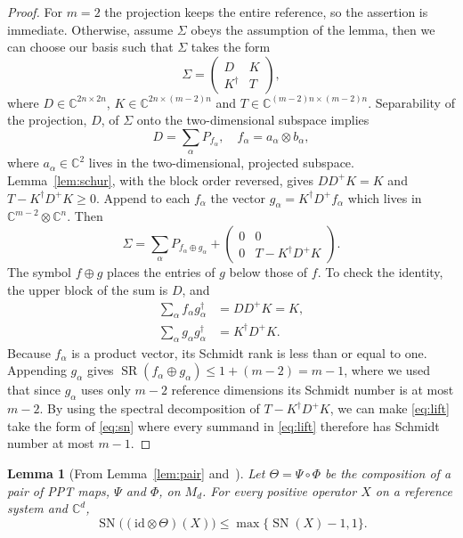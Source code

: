 \documentclass[aps,prl,reprint,superscriptaddress,longbibliography,raggedbottom]{revtex4-2}
\newtheorem{lemma}{Lemma}
\newcommand{\C}{\mathbb C}
\newcommand{\id}{\mathrm{id}}
\newcommand{\SN}{\operatorname{SN}}
\newcommand{\SR}{\operatorname{SR}}
\begin{document}
\begin{proof}
For $m=2$ the projection keeps the entire reference, so the assertion
is immediate. Otherwise, assume $\Sigma$ obeys the assumption of the lemma, then we can choose our basis such that $\Sigma$ takes the form
\begin{equation}\label{eq:liftblocks}
\Sigma=\begin{pmatrix}D&K\\K^\dagger&T\end{pmatrix},
\end{equation}
where $D \in \C^{2n \times 2n}$, $K \in \C^{2n \times (m-2)n}$ and $T \in \C^{(m-2)n \times (m-2)n}$. Separability of the projection, $D$, of $\Sigma$ onto the two-dimensional subspace implies 
\begin{equation}
D=\sum_\alpha P_{f_\alpha},\quad f_\alpha=a_\alpha\otimes b_\alpha, 
\end{equation}
where $a_{\alpha} \in \C^2$ lives in the two-dimensional, projected subspace. 
Lemma~\ref{lem:schur}, with the block order reversed, gives
$DD^+K=K$ and $T-K^\dagger D^+K\ge0$. Append to each $f_\alpha$
the vector $g_\alpha=K^\dagger D^+f_\alpha$ which lives in $\C^{m-2} \otimes \C^n$. Then
\begin{equation}\label{eq:lift}
\Sigma=\sum_\alpha P_{f_\alpha\oplus g_\alpha}
+\begin{pmatrix}0&0\\0&T-K^\dagger D^+K\end{pmatrix}.
\end{equation}
The symbol $f\oplus g$ places the entries of $g$ below those of $f$.
To check the identity, the upper block of the sum is $D$, and
\begin{align*}
\sum_\alpha f_\alpha g_\alpha^\dagger&=DD^+K=K,\\
\sum_\alpha g_\alpha g_\alpha^\dagger&=K^\dagger D^+K.
\end{align*}
Because $f_\alpha$ is a product vector, its Schmidt rank is less than or equal to one. Appending $g_\alpha$
gives $\SR(f_\alpha\oplus g_\alpha)\le1+(m-2)=m-1$, where we used that since $g_{\alpha}$ uses only $m-2$ reference dimensions
its Schmidt number is at most $m-2$. By using the spectral decomposition of $T- K^{\dagger} D^+ K$, we can make \eqref{eq:lift} take the form of \eqref{eq:sn} where every summand in \eqref{eq:lift} therefore has
Schmidt number at most $m-1$. \end{proof}

\begin{lemma}[{From Lemma~\ref{lem:pair} and~\cite{CMHW19}}]\label{lem:reduction}
Let $\Theta=\Psi\circ\Phi$ be the composition of a pair of PPT maps, $\Psi$ and $\Phi$, on $M_d$.
For every positive operator $X$ on a reference system and $\C^d$,
\begin{equation}\label{eq:reduction}
\SN\bigl((\id\otimes\Theta)(X)\bigr)
\le\max\{\SN(X)-1,1\}.
\end{equation}
\end{lemma}
\end{document}
